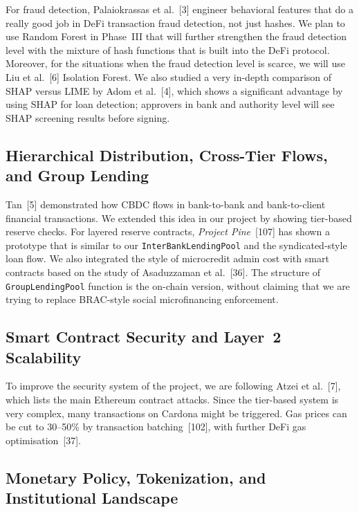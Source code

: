 For fraud detection, Palaiokrassas et al.~[3] engineer behavioral features that do a really good job in DeFi transaction fraud detection, not just hashes. We plan to use Random Forest in Phase~III that will further strengthen the fraud detection level with the mixture of hash functions that is built into the DeFi protocol. Moreover, for the situations when the fraud detection level is scarce, we will use Liu et al.~[6] Isolation Forest. We also studied a very in-depth comparison of SHAP versus LIME by Adom et al.~[4], which shows a significant advantage by using SHAP for loan detection; approvers in bank and authority level will see SHAP screening results before signing.

\subsection{Hierarchical Distribution, Cross-Tier Flows, and Group Lending}
\label{sec:lit-cross-tier}

Tan~[5] demonstrated how CBDC flows in bank-to-bank and bank-to-client financial transactions. We extended this idea in our project by showing tier-based reserve checks. For layered reserve contracts, \textit{Project Pine}~[107] has shown a prototype that is similar to our \texttt{InterBankLendingPool} and the syndicated-style loan flow. We also integrated the style of microcredit admin cost with smart contracts based on the study of Asaduzzaman et al.~[36]. The structure of \texttt{GroupLendingPool} function is the on-chain version, without claiming that we are trying to replace BRAC-style social microfinancing enforcement.

\subsection{Smart Contract Security and Layer~2 Scalability}

To improve the security system of the project, we are following Atzei et al.~[7], which lists the main Ethereum contract attacks. Since the tier-based system is very complex, many transactions on Cardona might be triggered. Gas prices can be cut to 30--50\% by transaction batching~[102], with further DeFi gas optimisation~[37].

\subsection{Monetary Policy, Tokenization, and Institutional Landscape}
\label{sec:lit-institutional}

